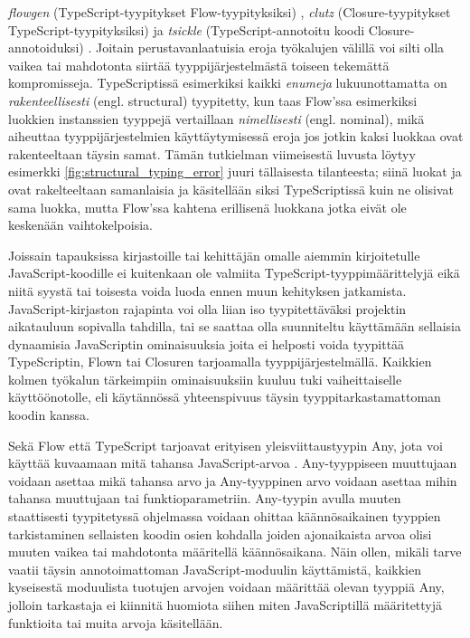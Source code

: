 \textit{flowgen} (TypeScript-tyypitykset Flow-tyypityksiksi) \cite{Flowgen},
\textit{clutz}  (Closure-tyypitykset TypeScript-tyypityksiksi) \cite{Clutz}
ja \textit{tsickle} (TypeScript-annotoitu koodi Closure-annotoiduksi) \cite{Tsickle}.
Joitain perustavanlaatuisia eroja työkalujen välillä voi silti olla vaikea
tai mahdotonta siirtää tyyppijärjestelmästä toiseen tekemättä kompromisseja.
TypeScriptissä esimerkiksi kaikki \textit{enumeja} lukuunottamatta on
\textit{rakenteellisesti} (engl. structural) tyypitetty, kun taas Flow'ssa 
esimerkiksi luokkien instanssien tyyppejä vertaillaan \textit{nimellisesti}
(engl. nominal), mikä aiheuttaa tyyppijärjestelmien käyttäytymisessä eroja
jos jotkin kaksi luokkaa ovat rakenteeltaan täysin samat. Tämän tutkielman
viimeisestä luvusta löytyy esimerkki \ref{fig:structural_typing_error}
juuri tällaisesta tilanteesta; siinä luokat  ja
 ovat rakelteeltaan samanlaisia ja käsitellään siksi
TypeScriptissä kuin ne olisivat sama luokka, mutta Flow'ssa kahtena
erillisenä luokkana jotka eivät ole keskenään vaihtokelpoisia. 

Joissain tapauksissa kirjastoille tai kehittäjän omalle aiemmin kirjoitetulle
JavaScript-koodille ei kuitenkaan ole valmiita TypeScript-tyyppimäärittelyjä
eikä niitä syystä tai toisesta voida luoda ennen muun kehityksen jatkamista.
JavaScript-kirjaston rajapinta voi olla liian iso tyypitettäväksi projektin
aikatauluun sopivalla tahdilla, tai se saattaa olla suunniteltu käyttämään
sellaisia dynaamisia JavaScriptin ominaisuuksia joita ei helposti voida
tyypittää TypeScriptin, Flown tai Closuren tarjoamalla tyyppijärjestelmällä.
Kaikkien kolmen työkalun tärkeimpiin ominaisuuksiin kuuluu tuki vaiheittaiselle
käyttöönotolle, eli käytännössä yhteenspivuus täysin tyyppitarkastamattoman
koodin kanssa.

Sekä Flow että TypeScript tarjoavat erityisen
yleisviittaustyypin Any, jota voi käyttää kuvaamaan mitä tahansa
JavaScript-arvoa \cite{TypeScriptSpec}. Any-tyyppiseen muuttujaan voidaan asettaa mikä
tahansa arvo ja Any-tyyppinen arvo voidaan asettaa mihin tahansa muuttujaan
tai funktioparametriin. Any-tyypin avulla muuten staattisesti tyypitetyssä
ohjelmassa voidaan ohittaa käännösaikainen tyyppien tarkistaminen sellaisten
koodin osien kohdalla joiden ajonaikaista arvoa olisi muuten vaikea tai
mahdotonta määritellä käännösaikana. Näin ollen, mikäli tarve vaatii täysin
annotoimattoman JavaScript-moduulin käyttämistä, kaikkien kyseisestä moduulista
tuotujen arvojen voidaan määrittää olevan tyyppiä Any, jolloin tarkastaja ei
kiinnitä huomiota siihen miten JavaScriptillä määritettyjä funktioita tai
muita arvoja käsitellään.